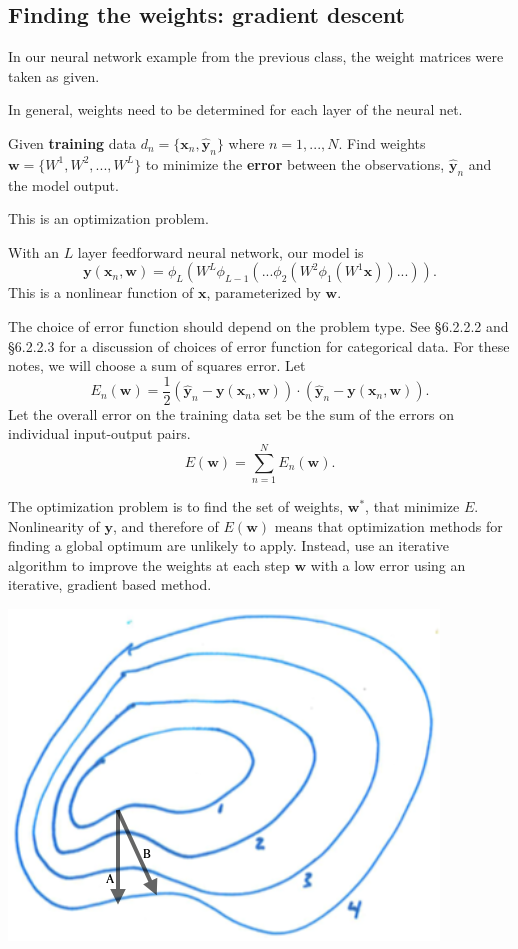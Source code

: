 \documentclass[12pt,letterpaper,noanswers]{exam}
\newcommand{\vc}[1]{\boldsymbol{#1}}
\newcommand{\note}[1]{{#1}} %
\begin{document}
\subsection*{Finding the weights: gradient descent}
\note{In our neural network example from the previous class, the weight matrices were taken as given.

In general, weights need to be determined for each layer of the neural net.
\begin{tcolorbox}
Given \textbf{training} data $d_n = \{\vc{x}_n,\hat{\vc{y}}_n\}$ where $n=1,...,N$.  Find weights $\vc{w} = \{W^1,W^2,...,W^L\}$ to minimize the \textbf{error} between the observations, $\hat{\vc{y}}_n$ and the model output.

This is an optimization problem.

\end{tcolorbox}

With an $L$ layer feedforward neural network, our model is \[\vc{y}(\vc{x}_n,\vc{w}) = \phi_L(W^L\phi_{L-1}(...\phi_2(W^2\phi_1(W^1\vc{x}))...)).\] This is a nonlinear function of $\vc{x}$, parameterized by $\vc{w}$.

The choice of error function should depend on the problem type.  See \cite{Goodfellow-et-al-2016} \S 6.2.2.2 and \S 6.2.2.3 for a discussion of choices of error function for categorical data.  For these notes, we will choose a sum of squares error.  Let \[E_n(\vc{w}) = \dfrac{1}{2}\left(\hat{\vc{y}}_n-\vc{y}(\vc{x}_n,\vc{w})\right)\cdot\left(\hat{\vc{y}}_n-\vc{y}(\vc{x}_n,\vc{w})\right).\]
Let the overall error on the training data set be the sum of the errors on individual input-output pairs.
\[E(\vc{w}) = \sum\limits_{n=1}^N E_n(\vc{w}).\]

The optimization problem is to find the set of weights, $\vc{w}^*$, that minimize $E$.  Nonlinearity of $\vc{y}$, and therefore of $E(\vc{w})$ means that optimization methods for finding a global optimum are unlikely to apply. Instead, use an iterative algorithm to improve the weights at each step $\vc{w}$ with a low error using an iterative, gradient based method.  
}
\includegraphics[scale=0.5]{img/C23gradient.png}
\end{document}
